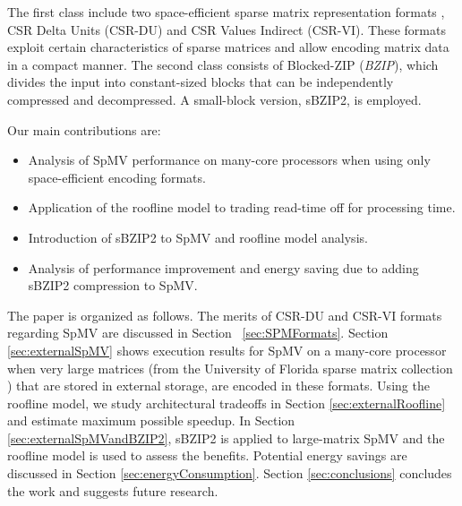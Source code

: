 The first class include two space-efficient sparse matrix representation formats \cite{kourtis2008improving}, CSR Delta Units (CSR-DU) and CSR Values Indirect (CSR-VI). These formats exploit certain characteristics of sparse matrices and allow encoding matrix data in a compact manner. The second class consists of Blocked-ZIP (\textit{BZIP}), which divides the input into constant-sized blocks that can be independently compressed and decompressed. A small-block version, sBZIP2, is employed.

Our main contributions are:
\begin{itemize}
	\item Analysis of SpMV performance on many-core processors when using only space-efficient encoding formats.
	\item Application of the roofline model \cite{williams2009roofline} to trading read-time off for processing time. 
	\item Introduction of sBZIP2 to SpMV and roofline model analysis.
	\item Analysis of performance improvement and energy saving due to adding sBZIP2 compression to SpMV.
\end{itemize}

The paper is organized as follows. The merits of CSR-DU and CSR-VI formats regarding SpMV are discussed in Section ~\ref{sec:SPMFormats}. Section \ref{sec:externalSpMV} shows execution results for SpMV on a many-core processor when very large matrices (from the University of Florida sparse matrix collection \cite{davis2011university}) that are stored in external storage, are encoded in these formats.  Using the roofline model, we study architectural tradeoffs in Section \ref{sec:externalRoofline} and estimate maximum possible speedup. In Section \ref{sec:externalSpMVandBZIP2}, sBZIP2 is applied to large-matrix SpMV and the roofline model is used to assess the benefits. Potential energy savings are discussed in Section \ref{sec:energyConsumption}. Section \ref{sec:conclusions} concludes the work and suggests future research.